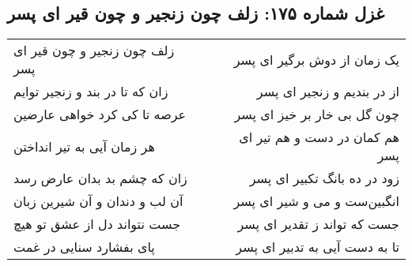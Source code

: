 \begin{center}
\section*{غزل شماره ۱۷۵: زلف چون زنجیر و چون قیر ای پسر}
\label{sec:175}
\begin{longtable}{l p{0.5cm} r}
زلف چون زنجیر و چون قیر ای پسر
&&
یک زمان از دوش برگیر ای پسر
\\
زان که تا در بند و زنجیر توایم
&&
از در بندیم و زنجیر ای پسر
\\
عرصه تا کی کرد خواهی عارضین
&&
چون گل بی خار بر خیز ای پسر
\\
هر زمان آیی به تیر انداختن
&&
هم کمان در دست و هم تیر ای پسر
\\
زان که چشم بد بدان عارض رسد
&&
زود در ده بانگ تکبیر ای پسر
\\
آن لب و دندان و آن شیرین زبان
&&
انگبین‌ست و می و شیر ای پسر
\\
جست نتواند دل از عشق تو هیچ
&&
جست که تواند ز تقدیر ای پسر
\\
پای بفشارد سنایی در غمت
&&
تا به دست آیی به تدبیر ای پسر
\\
\end{longtable}
\end{center}
